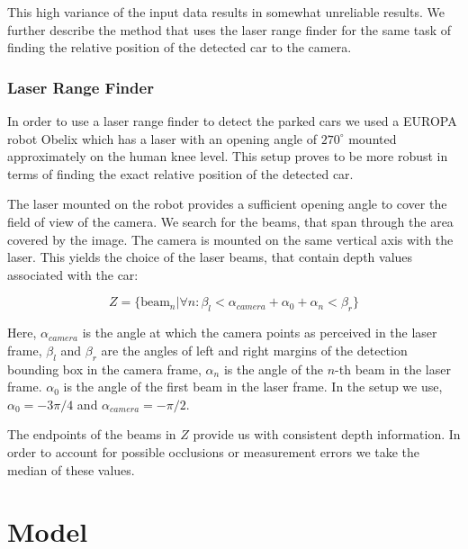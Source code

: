 This high variance of the input data results in somewhat unreliable results.
We further describe the method that uses the laser range finder for the same
task of finding the relative position of the detected car to the camera.

\subsubsection{Laser Range Finder}\label{ssub:laser_range_finder}

In order to use a laser range finder to detect the parked cars we used a
EUROPA robot Obelix which has a laser with an opening angle of $270^\circ$
mounted approximately on the human knee level. This setup proves to be more
robust in terms of finding the exact relative position of the detected car.

The laser mounted on the robot provides a sufficient opening angle to cover
the field of view of the camera. We search for the beams, that span through
the area covered by the image. The camera is mounted on the same vertical axis
with the laser. This yields the choice of the laser beams, that contain depth
values associated with the car:

\begin{equation}
Z = \{ \mbox{beam}_n | \forall n : \beta_{l} < \alpha_{camera} + \alpha_{0} + \alpha_{n} < \beta_{r} \}
\end{equation}

Here, $\alpha_{camera}$ is the angle at which the camera points as perceived
in the laser frame, $\beta_{l}$ and $\beta_{r}$ are the angles of left and
right margins of the detection bounding box in the camera frame, $\alpha_{n}$
is the angle of the $n$-th beam in the laser frame. $\alpha_{0}$ is the angle
of the first beam in the laser frame. In the setup we use, $\alpha_{0} =
-3\pi/4$ and $\alpha_{camera} = -\pi/2$.

The endpoints of the beams in $Z$ provide us with consistent depth
information. In order to account for possible occlusions or measurement errors
we take the median of these values.


\section{Model} %
\label{sec:model}

